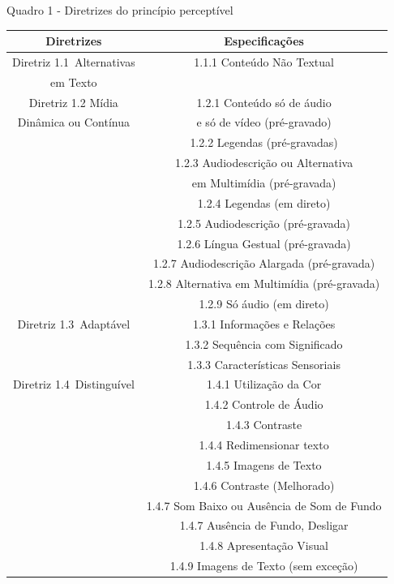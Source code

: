 \documentclass[a4paper]{article}
\begin{document}
\begin{titlepage}
Quadro 1 - Diretrizes do princípio perceptível\\[-1cm]
\begin{center}
	\fontsize{8pt}{8pt}\selectfont
	\begin{longtable}{|c|c|}
		\hline
		Diretrizes & Especificações \\
		\hline
		Diretriz 1.1 Alternativas& 1.1.1 Conteúdo Não Textual\\
		em Texto & \\
		\hline
		Diretriz 1.2 Mídia & 1.2.1 Conteúdo só de áudio\\
		Dinâmica ou Contínua & e só de vídeo (pré-gravado) \\
		& 1.2.2 Legendas (pré-gravadas)\\
		& 1.2.3 Audiodescrição ou Alternativa\\
		& em Multimídia (pré-gravada)\\
		& 1.2.4 Legendas (em direto)\\
		& 1.2.5 Audiodescrição (pré-gravada)\\
		& 1.2.6 Língua Gestual (pré-gravada)\\
		& 1.2.7 Audiodescrição Alargada (pré-gravada)\\
		& 1.2.8 Alternativa em Multimídia (pré-gravada)\\
		& 1.2.9 Só áudio (em direto)\\
		\hline
		Diretriz 1.3 Adaptável& 1.3.1 Informações e Relações\\
		& 1.3.2 Sequência com Significado\\
		& 1.3.3 Características Sensoriais\\
		\hline
		Diretriz 1.4 Distinguível& 1.4.1 Utilização da Cor\\
		& 1.4.2 Controle de Áudio\\
		& 1.4.3 Contraste\\
		& 1.4.4 Redimensionar texto\\
		& 1.4.5 Imagens de Texto\\
		& 1.4.6 Contraste (Melhorado)\\
		& 1.4.7 Som Baixo ou Ausência de Som de Fundo\\
		& 1.4.7 Ausência de Fundo, Desligar\\
		& 1.4.8 Apresentação Visual\\
		& 1.4.9 Imagens de Texto (sem exceção)\\
		\hline
	\end{longtable}
\end{center}


\end{titlepage}
\end{document}
